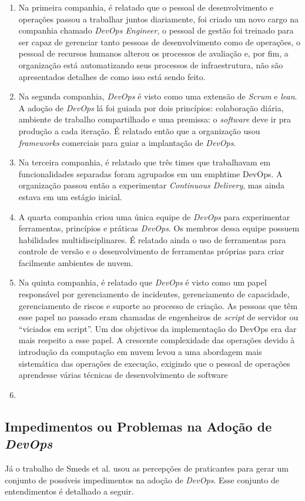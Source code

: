 \begin{enumerate}
\item Na primeira companhia, é relatado que o pessoal de desenvolvimento e
operações passou a trabalhar juntos diariamente, foi criado um novo cargo na
companhia chamado \textit{DevOps Engineer}, o pessoal de gestão foi treinado
para ser capaz de gerenciar tanto pessoas de desenvolvimento como de operações,
o pessoal de recursos humanos alterou os processos de avaliação e, por fim,
a organização está automatizando seus processos de infraestrutura, não são
apresentados detalhes de como isso está sendo feito.

\item Na segunda companhia, \textit{DevOps} é visto como uma extensão de
\textit{Scrum} e \textit{lean}. A adoção de \textit{DevOps} lá foi guiada por
dois princípios: colaboração diária, ambiente de trabalho compartilhado e uma
premissa: o \textit{software} deve ir pra produção a cada iteração. É relatado
então que a organização usou \textit{frameworks} comerciais para guiar a
implantação de \textit{DevOps}.

\item Na terceira companhia, é relatado que três times que trabalhavam em
funcionalidades separadas foram agrupados em um emph{time DevOps}. A organização
passou então a experimentar \textit{Continuous Delivery}, mas ainda estava em
um estágio inicial.

\item A quarta companhia criou uma única equipe de \textit{DevOps} para
experimentar ferramentas, princípios e práticas \textit{DevOps}. Os
membros dessa equipe possuem habilidades multidisciplinares. É relatado ainda
o uso de ferramentas para controle de versão e o desenvolvimento de ferramentas
próprias para criar facilmente ambientes de nuvem.

\item Na quinta companhia, é relatado que \textit{DevOps} é visto como
um papel responsável por gerenciamento de incidentes, gerenciamento de
capacidade, gerenciamento de riscos e suporte ao processo de criação.
As pessoas que têm esse papel no passado eram chamadas de engenheiros de
\textit{script} de servidor ou ``viciados em script''. Um dos objetivos da implementação do DevOps era dar mais respeito a esse papel. A crescente complexidade das operações devido à introdução da computação em nuvem levou a uma abordagem mais sistemática das operações de execução, exigindo que o pessoal de operações aprendesse várias técnicas de desenvolvimento de software

\item

\end{enumerate}

\subsection{Impedimentos ou Problemas na Adoção de \textit{DevOps}}

Já o trabalho de Smeds et al. usou as percepções de praticantes para gerar
um conjunto de possíveis impedimentos na adoção de \textit{DevOps}. Esse
conjunto de entendimentos é detalhado a seguir.
